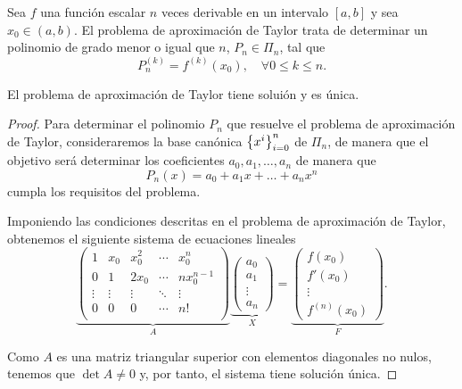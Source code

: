   \begin{definition}
    Sea $f$ una función escalar $n$ veces derivable en un intervalo $[a,
    b]$ y sea $x_0 \in (a, b)$. El problema de aproximación de Taylor trata
    de determinar un polinomio de grado menor o igual que $n$, 
    $P_n \in \Pi_n$, tal que
    \[
      P_n^{(k)} = f^{(k)}(x_0), \quad \forall 0 \le k \le n.
    \]
  \end{definition}

  \begin{theorem}
    El problema de aproximación de Taylor tiene soluión y es única. 
  \end{theorem}

  \begin{proof}
    Para determinar el polinomio $P_n$ que resuelve el problema de
    aproximación de Taylor, consideraremos la base canónica
    $\left\lbrace x^i\right\rbrace_{i=0}^{n}$ de $\Pi_n$, de manera que el objetivo será
    determinar los coeficientes $a_0, a_1, \dots, a_n$ de manera que
    \[
      P_n(x) = a_0 + a_1 x + \dots + a_n x^n
    \]
    cumpla los requisitos del problema.

    Imponiendo las condiciones descritas en el problema de aproximación de
    Taylor, obtenemos el siguiente sistema de ecuaciones lineales
    \[
      \underbrace{
        \begin{pmatrix}
          1 & x_0 & x_0^2 & \cdots & x_0^n \\
          0 & 1 & 2 x_0 & \cdots & n x_0^{n-1} \\
          \vdots & \vdots & \vdots & \ddots & \vdots \\
          0 & 0 & 0 & \cdots & n! \\
        \end{pmatrix}
      }_A
      \underbrace{
        \begin{pmatrix}
          a_0 \\ a_1 \\ \vdots \\ a_n
        \end{pmatrix}
      }_X
      =
      \underbrace{
        \begin{pmatrix}
          f(x_0) \\ f'(x_0) \\ \vdots \\ f^{(n)}(x_0)
        \end{pmatrix}
      }_F.
    \]

    Como $A$ es una matriz triangular superior con elementos diagonales no
    nulos, tenemos que $\det A \neq 0$ y, por tanto, el sistema tiene
    solución única.
  \end{proof}

